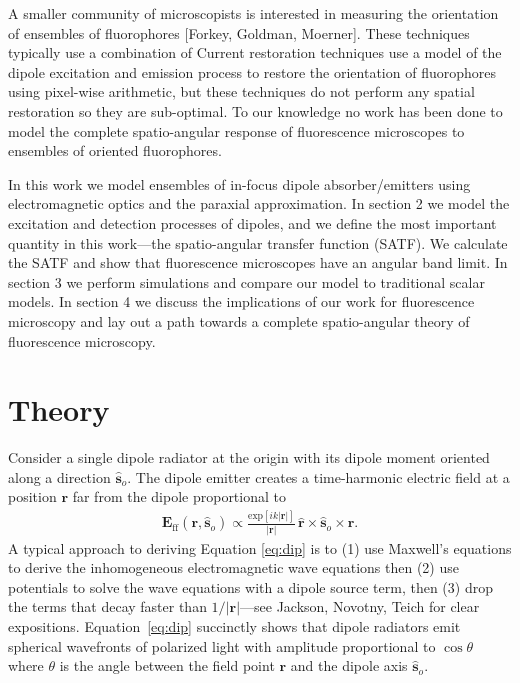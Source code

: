 \documentclass{osa-article}
\providecommand{\mb}[1]{\mathbf{#1}}
\providecommand{\so}{\mathbf{\hat{s}}_o}
\providecommand{\mh}[1]{\mathbf{\hat{#1}}}
\begin{document}
A smaller community of microscopists is interested in measuring the orientation
of ensembles of fluorophores \cite{mehta2016} [Forkey, Goldman, Moerner].
These techniques typically use a combination of 
Current restoration techniques use a model of the dipole excitation and emission
process to restore the orientation of fluorophores using pixel-wise arithmetic,
but these techniques do not perform any spatial restoration so they are
sub-optimal. To our knowledge no work has been done to model the complete
spatio-angular response of fluorescence microscopes to ensembles of oriented
fluorophores.

In this work we model ensembles of in-focus dipole absorber/emitters using
electromagnetic optics and the paraxial approximation. In section 2 we model the
excitation and detection processes of dipoles, and we define the most important
quantity in this work---the spatio-angular transfer function (SATF). We
calculate the SATF and show that fluorescence microscopes have an angular band
limit. In section 3 we perform simulations and compare our model to traditional
scalar models. In section 4 we discuss the implications of our work for
fluorescence microscopy and lay out a path towards a complete spatio-angular
theory of fluorescence microscopy.

\section{Theory}
Consider a single dipole radiator at the origin with its dipole moment oriented
along a direction $\so$. The dipole emitter creates a time-harmonic electric
field at a position $\mb{r}$ far from the dipole proportional to
\begin{align}
  \mb{E}_{\text{ff}}(\mb{r}, \so) \propto \frac{\text{exp}[ik|\mb{r}|]}{|\mb{r}|}\, \mh{r}\times\so\times\mh{r}.\label{eq:dip}
\end{align}
A typical approach to deriving Equation \ref{eq:dip} is to (1) use Maxwell's
equations to derive the inhomogeneous electromagnetic wave equations then (2)
use potentials to solve the wave equations with a dipole source term, then (3)
drop the terms that decay faster than $1/|\mb{r}|$---see Jackson, Novotny, Teich
for clear expositions. Equation~\ref{eq:dip} succinctly shows that dipole
radiators emit spherical wavefronts of polarized light with amplitude
proportional to $\cos\theta$ where $\theta$ is the angle between the field point
$\mb{r}$ and the dipole axis $\so$.
\end{document}
